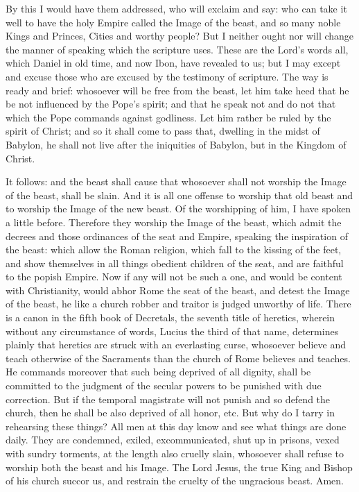 By this I would have them addressed, who will exclaim and say: who can take it well to have the holy Empire called the Image of the beast, and so many noble Kings and Princes, Cities and worthy people? But I neither ought nor will change the manner of speaking which the scripture uses. These are the Lord’s words all, which Daniel in old time, and now Ibon, have revealed to us; but I may except and excuse those who are excused by the testimony of scripture. The way is ready and brief: whosoever will be free from the beast, let him take heed that he be not influenced by the Pope’s spirit; and that he speak not and do not that which the Pope commands against godliness. Let him rather be ruled by the spirit of Christ; and so it shall come to pass that, dwelling in the midst of Babylon, he shall not live after the iniquities of Babylon, but in the Kingdom of Christ.

It follows: and the beast shall cause that whosoever shall not worship the Image of the beast, shall be slain. And it is all one offense to worship that old beast and to worship the Image of the new beast. Of the worshipping of him, I have spoken a little before. Therefore they worship the Image of the beast, which admit the decrees and those ordinances of the seat and Empire, speaking the inspiration of the beast: which allow the Roman religion, which fall to the kissing of the feet, and show themselves in all things obedient children of the seat, and are faithful to the popish Empire. Now if any will not be such a one, and would be content with Christianity, would abhor Rome the seat of the beast, and detest the Image of the beast, he like a church robber and traitor is judged unworthy of life. There is a canon in the fifth book of Decretals, the seventh title of heretics, wherein without any circumstance of words, Lucius the third of that name, determines plainly that heretics are struck with an everlasting curse, whosoever believe and teach otherwise of the Sacraments than the church of Rome believes and teaches. He commands moreover that such being deprived of all dignity, shall be committed to the judgment of the secular powers to be punished with due correction. But if the temporal magistrate will not punish and so defend the church, then he shall be also deprived of all honor, etc. But why do I tarry in rehearsing these things? All men at this day know and see what things are done daily. They are condemned, exiled, excommunicated, shut up in prisons, vexed with sundry torments, at the length also cruelly slain, whosoever shall refuse to worship both the beast and his Image. The Lord Jesus, the true King and Bishop of his church succor us, and restrain the cruelty of the ungracious beast. Amen.
